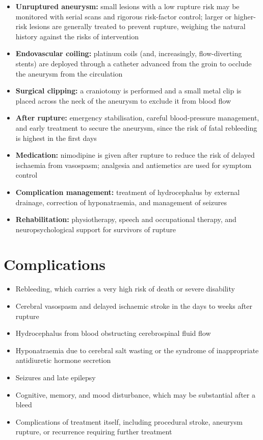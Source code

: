 \begin{itemize}
    \item \textbf{Unruptured aneurysm:} small lesions with a low rupture risk may be monitored with serial scans and rigorous risk-factor control; larger or higher-risk lesions are generally treated to prevent rupture, weighing the natural history against the risks of intervention
    \item \textbf{Endovascular coiling:} platinum coils (and, increasingly, flow-diverting stents) are deployed through a catheter advanced from the groin to occlude the aneurysm from the circulation
    \item \textbf{Surgical clipping:} a craniotomy is performed and a small metal clip is placed across the neck of the aneurysm to exclude it from blood flow
    \item \textbf{After rupture:} emergency stabilisation, careful blood-pressure management, and early treatment to secure the aneurysm, since the risk of fatal rebleeding is highest in the first days
    \item \textbf{Medication:} nimodipine is given after rupture to reduce the risk of delayed ischaemia from vasospasm; analgesia and antiemetics are used for symptom control
    \item \textbf{Complication management:} treatment of hydrocephalus by external drainage, correction of hyponatraemia, and management of seizures
    \item \textbf{Rehabilitation:} physiotherapy, speech and occupational therapy, and neuropsychological support for survivors of rupture
\end{itemize}

\section*{Complications}
\begin{itemize}
    \item Rebleeding, which carries a very high risk of death or severe disability
    \item Cerebral vasospasm and delayed ischaemic stroke in the days to weeks after rupture
    \item Hydrocephalus from blood obstructing cerebrospinal fluid flow
    \item Hyponatraemia due to cerebral salt wasting or the syndrome of inappropriate antidiuretic hormone secretion
    \item Seizures and late epilepsy
    \item Cognitive, memory, and mood disturbance, which may be substantial after a bleed
    \item Complications of treatment itself, including procedural stroke, aneurysm rupture, or recurrence requiring further treatment
\end{itemize}

